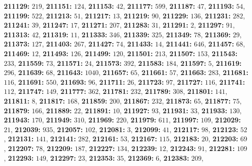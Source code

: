\textsf{\bfseries 211129:} $219$, \textsf{\bfseries 211151:} $124$, \textsf{\bfseries 211153:} $42$, \textsf{\bfseries 211177:} $599$, \textsf{\bfseries 211187:} $47$, \textsf{\bfseries 211193:} $54$, \textsf{\bfseries 211199:} $522$, \textsf{\bfseries 211213:} $51$, \textsf{\bfseries 211217:} $13$, \textsf{\bfseries 211219:} $90$, \textsf{\bfseries 211229:} $136$, \textsf{\bfseries 211231:} $282$, \textsf{\bfseries 211241:} $39$, \textsf{\bfseries 211247:} $17$, \textsf{\bfseries 211271:} $207$, \textsf{\bfseries 211283:} $31$, \textsf{\bfseries 211291:} $2$, \textsf{\bfseries 211297:} $91$, \textsf{\bfseries 211313:} $42$, \textsf{\bfseries 211319:} $11$, \textsf{\bfseries 211333:} $346$, \textsf{\bfseries 211339:} $325$, \textsf{\bfseries 211349:} $78$, \textsf{\bfseries 211369:} $29$, \textsf{\bfseries 211373:} $127$, \textsf{\bfseries 211403:} $267$, \textsf{\bfseries 211427:} $74$, \textsf{\bfseries 211433:} $14$, \textsf{\bfseries 211441:} $646$, \textsf{\bfseries 211457:} $68$, \textsf{\bfseries 211469:} $12$, \textsf{\bfseries 211493:} $126$, \textsf{\bfseries 211499:} $120$, \textsf{\bfseries 211501:} $213$, \textsf{\bfseries 211507:} $153$, \textsf{\bfseries 211543:} $233$, \textsf{\bfseries 211559:} $73$, \textsf{\bfseries 211571:} $24$, \textsf{\bfseries 211573:} $392$, \textsf{\bfseries 211583:} $184$, \textsf{\bfseries 211597:} $5$, \textsf{\bfseries 211619:} $296$, \textsf{\bfseries 211639:} $68$, \textsf{\bfseries 211643:} $1040$, \textsf{\bfseries 211657:} $65$, \textsf{\bfseries 211661:} $57$, \textsf{\bfseries 211663:} $283$, \textsf{\bfseries 211681:} $116$, \textsf{\bfseries 211691:} $550$, \textsf{\bfseries 211693:} $96$, \textsf{\bfseries 211711:} $26$, \textsf{\bfseries 211723:} $97$, \textsf{\bfseries 211727:} $116$, \textsf{\bfseries 211741:} $112$, \textsf{\bfseries 211747:} $149$, \textsf{\bfseries 211777:} $362$, \textsf{\bfseries 211781:} $232$, \textsf{\bfseries 211789:} $308$, \textsf{\bfseries 211801:} $141$, \textsf{\bfseries 211811:} $8$, \textsf{\bfseries 211817:} $168$, \textsf{\bfseries 211859:} $200$, \textsf{\bfseries 211867:} $232$, \textsf{\bfseries 211873:} $65$, \textsf{\bfseries 211877:} $75$, \textsf{\bfseries 211879:} $166$, \textsf{\bfseries 211889:} $22$, \textsf{\bfseries 211891:} $10$, \textsf{\bfseries 211927:} $93$, \textsf{\bfseries 211931:} $33$, \textsf{\bfseries 211933:} $130$, \textsf{\bfseries 211943:} $170$, \textsf{\bfseries 211949:} $310$, \textsf{\bfseries 211969:} $220$, \textsf{\bfseries 211979:} $611$, \textsf{\bfseries 211997:} $109$, \textsf{\bfseries 212029:} $21$, \textsf{\bfseries 212039:} $935$, \textsf{\bfseries 212057:} $102$, \textsf{\bfseries 212081:} $3$, \textsf{\bfseries 212099:} $41$, \textsf{\bfseries 212117:} $98$, \textsf{\bfseries 212123:} $52$, \textsf{\bfseries 212131:} $141$, \textsf{\bfseries 212141:} $282$, \textsf{\bfseries 212161:} $53$, \textsf{\bfseries 212167:} $115$, \textsf{\bfseries 212183:} $20$, \textsf{\bfseries 212203:} $69$, \textsf{\bfseries 212207:} $78$, \textsf{\bfseries 212209:} $187$, \textsf{\bfseries 212227:} $134$, \textsf{\bfseries 212239:} $12$, \textsf{\bfseries 212243:} $91$, \textsf{\bfseries 212281:} $109$, \textsf{\bfseries 212293:} $149$, \textsf{\bfseries 212297:} $23$, \textsf{\bfseries 212353:} $35$, \textsf{\bfseries 212369:} $6$, \textsf{\bfseries 212383:} $209$, 
